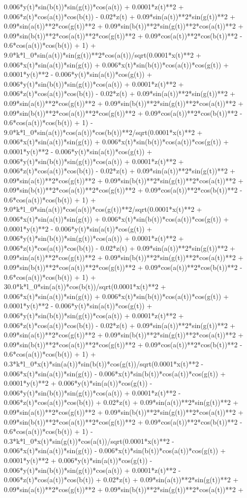 0.006*y(t)*sin(b(t))*sin(g(t))*cos(a(t)) + 0.0001*z(t)**2 + 0.006*z(t)*cos(a(t))*cos(b(t)) - 0.02*z(t) + 0.09*sin(a(t))**2*sin(g(t))**2 + 0.09*sin(a(t))**2*cos(g(t))**2 + 0.09*sin(b(t))**2*sin(g(t))**2*cos(a(t))**2 + 0.09*sin(b(t))**2*cos(a(t))**2*cos(g(t))**2 + 0.09*cos(a(t))**2*cos(b(t))**2 - 0.6*cos(a(t))*cos(b(t)) + 1) + 9.0*k*l_0*sin(a(t))*sin(g(t))**2*cos(a(t))/sqrt(0.0001*x(t)**2 + 0.006*x(t)*sin(a(t))*sin(g(t)) + 0.006*x(t)*sin(b(t))*cos(a(t))*cos(g(t)) + 0.0001*y(t)**2 - 0.006*y(t)*sin(a(t))*cos(g(t)) + 0.006*y(t)*sin(b(t))*sin(g(t))*cos(a(t)) + 0.0001*z(t)**2 + 0.006*z(t)*cos(a(t))*cos(b(t)) - 0.02*z(t) + 0.09*sin(a(t))**2*sin(g(t))**2 + 0.09*sin(a(t))**2*cos(g(t))**2 + 0.09*sin(b(t))**2*sin(g(t))**2*cos(a(t))**2 + 0.09*sin(b(t))**2*cos(a(t))**2*cos(g(t))**2 + 0.09*cos(a(t))**2*cos(b(t))**2 - 0.6*cos(a(t))*cos(b(t)) + 1) - 9.0*k*l_0*sin(a(t))*cos(a(t))*cos(b(t))**2/sqrt(0.0001*x(t)**2 + 0.006*x(t)*sin(a(t))*sin(g(t)) + 0.006*x(t)*sin(b(t))*cos(a(t))*cos(g(t)) + 0.0001*y(t)**2 - 0.006*y(t)*sin(a(t))*cos(g(t)) + 0.006*y(t)*sin(b(t))*sin(g(t))*cos(a(t)) + 0.0001*z(t)**2 + 0.006*z(t)*cos(a(t))*cos(b(t)) - 0.02*z(t) + 0.09*sin(a(t))**2*sin(g(t))**2 + 0.09*sin(a(t))**2*cos(g(t))**2 + 0.09*sin(b(t))**2*sin(g(t))**2*cos(a(t))**2 + 0.09*sin(b(t))**2*cos(a(t))**2*cos(g(t))**2 + 0.09*cos(a(t))**2*cos(b(t))**2 - 0.6*cos(a(t))*cos(b(t)) + 1) + 9.0*k*l_0*sin(a(t))*cos(a(t))*cos(g(t))**2/sqrt(0.0001*x(t)**2 + 0.006*x(t)*sin(a(t))*sin(g(t)) + 0.006*x(t)*sin(b(t))*cos(a(t))*cos(g(t)) + 0.0001*y(t)**2 - 0.006*y(t)*sin(a(t))*cos(g(t)) + 0.006*y(t)*sin(b(t))*sin(g(t))*cos(a(t)) + 0.0001*z(t)**2 + 0.006*z(t)*cos(a(t))*cos(b(t)) - 0.02*z(t) + 0.09*sin(a(t))**2*sin(g(t))**2 + 0.09*sin(a(t))**2*cos(g(t))**2 + 0.09*sin(b(t))**2*sin(g(t))**2*cos(a(t))**2 + 0.09*sin(b(t))**2*cos(a(t))**2*cos(g(t))**2 + 0.09*cos(a(t))**2*cos(b(t))**2 - 0.6*cos(a(t))*cos(b(t)) + 1) + 30.0*k*l_0*sin(a(t))*cos(b(t))/sqrt(0.0001*x(t)**2 + 0.006*x(t)*sin(a(t))*sin(g(t)) + 0.006*x(t)*sin(b(t))*cos(a(t))*cos(g(t)) + 0.0001*y(t)**2 - 0.006*y(t)*sin(a(t))*cos(g(t)) + 0.006*y(t)*sin(b(t))*sin(g(t))*cos(a(t)) + 0.0001*z(t)**2 + 0.006*z(t)*cos(a(t))*cos(b(t)) - 0.02*z(t) + 0.09*sin(a(t))**2*sin(g(t))**2 + 0.09*sin(a(t))**2*cos(g(t))**2 + 0.09*sin(b(t))**2*sin(g(t))**2*cos(a(t))**2 + 0.09*sin(b(t))**2*cos(a(t))**2*cos(g(t))**2 + 0.09*cos(a(t))**2*cos(b(t))**2 - 0.6*cos(a(t))*cos(b(t)) + 1) + 0.3*k*l_0*x(t)*sin(a(t))*sin(b(t))*cos(g(t))/sqrt(0.0001*x(t)**2 - 0.006*x(t)*sin(a(t))*sin(g(t)) - 0.006*x(t)*sin(b(t))*cos(a(t))*cos(g(t)) + 0.0001*y(t)**2 + 0.006*y(t)*sin(a(t))*cos(g(t)) - 0.006*y(t)*sin(b(t))*sin(g(t))*cos(a(t)) + 0.0001*z(t)**2 - 0.006*z(t)*cos(a(t))*cos(b(t)) + 0.02*z(t) + 0.09*sin(a(t))**2*sin(g(t))**2 + 0.09*sin(a(t))**2*cos(g(t))**2 + 0.09*sin(b(t))**2*sin(g(t))**2*cos(a(t))**2 + 0.09*sin(b(t))**2*cos(a(t))**2*cos(g(t))**2 + 0.09*cos(a(t))**2*cos(b(t))**2 - 0.6*cos(a(t))*cos(b(t)) + 1) - 0.3*k*l_0*x(t)*sin(g(t))*cos(a(t))/sqrt(0.0001*x(t)**2 - 0.006*x(t)*sin(a(t))*sin(g(t)) - 0.006*x(t)*sin(b(t))*cos(a(t))*cos(g(t)) + 0.0001*y(t)**2 + 0.006*y(t)*sin(a(t))*cos(g(t)) - 0.006*y(t)*sin(b(t))*sin(g(t))*cos(a(t)) + 0.0001*z(t)**2 - 0.006*z(t)*cos(a(t))*cos(b(t)) + 0.02*z(t) + 0.09*sin(a(t))**2*sin(g(t))**2 + 0.09*sin(a(t))**2*cos(g(t))**2 + 0.09*sin(b(t))**2*sin(g(t))**2*cos(a(t))**2 + 